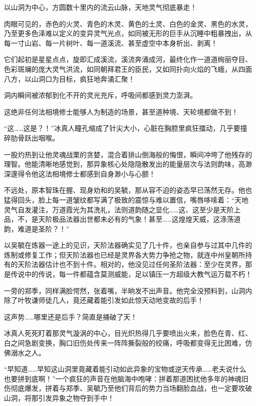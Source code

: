 以山洞为中心，方圆数十里内的流云山脉，天地灵气彻底暴走！

肉眼可见的，赤色的火灵、青色的木灵、黄色的土灵、白色的金灵、黑色的水灵，乃至更多色泽难以定义的变异灵气光点，如同被无形的巨手从沉睡中粗暴拽出，从每一寸山岩、每一片树叶、每一道溪流、甚至虚空中本身析出、剥离！

它们起初是星星点点，旋即汇成溪流，溪流奔涌成河，最终化作一道道绚丽夺目、色彩斑斓的庞大灵气洪流，如同朝拜君王的臣民，又如同扑向火焰的飞蛾，从四面八方，以山洞口为目标，疯狂地奔涌汇聚！

洞内瞬间被浓郁到化不开的灵光充斥，呼吸间都感到灵力澎湃。

\vspace{2em}

这绝非任何法相境修士能够人为制造的场景，甚至道种境、天轮境都做不到！

\vspace{2em}

“这……这是？！”冰真人瞳孔缩成了针尖大小，心脏在胸腔里疯狂擂动，几乎要撞碎肋骨跃出咽喉。

一股灼热到让他灵魂战栗的贪婪，混合着排山倒海般的悔恨，瞬间冲垮了他残存的理智。他能清晰地感觉到，那异象核心处隐隐散发出的能量层次与法则韵味，高渺深邃得令他这法相境修士都感到自身渺小与心颤！

不远处，原本智珠在握、现身劝和的吴毓，那从容不迫的姿态早已荡然无存。他也猛得回头，脸上每一道皱纹都写满了极致的震惊与难以置信，嘴唇哆嗦着：“天地灵气自发灌注，万道霞光为其洗礼，法则道韵随之显化……这、这至少是天阶上品，不，是天阶极品法器出世都未必有的气象！甚至……这煌煌天威，这涤荡道韵，难道是圣阶？！”

以吴毓在炼器一途上的见识，天阶法器确实见了几十件，也亲自参与过其中几件的炼制或修复工作；但天阶法器也已经是灵界各大势力争抢之物，就连中州皇朝所持有的天阶法器估计也不到十件。相对的，他没见过任何圣阶法器：至少在灵界，那是传说中的传说，每一件都蕴含莫测威能，足以镇压一方超级大教气运万载不朽！

一旁的郑季，同样满脸愕然，张着嘴，半晌发不出声音。他完全没预料到，山洞内除了叶牧谦师徒几人，竟还藏着能引发如此惊天动地变故的后手！

这声势……哪里还是后手？简直是捅破了天！

冰真人死死盯着那灵气漩涡的中心，目光炽热得几乎要喷出火来，脸色在青、红、白之间急剧变换，胸口旧伤处传来一阵阵撕裂般的绞痛，呼吸都变得无比困难，仿佛溺水之人。

“早知道……早知这山洞里竟藏着能引动如此异象的宝物或逆天传承……老夫说什么也要拼到底啊！”一个疯狂的声音在他脑海中咆哮：拼着那道困扰他多年的神魂旧伤彻底爆发，拼着与郑季、吴毓乃至他们背后的势力当场翻脸血战，也一定要攻破山洞，将那引发异象之物夺到手中！

